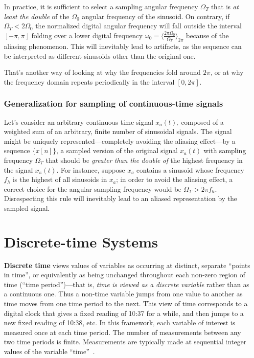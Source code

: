 \documentclass[\documentfontsize, twocolumn]{\classname}
\begin{document}
In practice, it is sufficient to select a sampling angular frequency $\Omega_T$ that is \emph{at least the double} of the $\Omega_0$ angular frequency of the sinusoid. On contrary, if $\Omega_T < 2\Omega_0$ the normalized digital angular frequency will fall outside the interval $[-\pi, \pi]$ folding over a lower digital frequency $\omega_0 = \langle \frac{2 \pi \Omega_0 }{\Omega_T}\rangle_{2\pi}$ because of the aliasing phenomenon. This will inevitably lead to artifacts, as the sequence can be interpreted as different sinusoids other than the original one.

That's another way of looking at why the frequencies fold around $2\pi$, or at why the frequency domain repeats periodically in the interval $[0, 2\pi]$.

\subsection{Generalization for sampling of continuous-time signals}

Let's consider an arbitrary continuous-time signal $x_a(t)$, composed of a weighted sum of an arbitrary, finite number of sinusoidal signals. The signal might be uniquely represented---completely avoiding the aliasing effect---by a sequence $\{x[n]\}$, a sampled version of the original signal $x_a(t)$ with sampling frequency $\Omega_T$ that should be \emph{greater than the double of} the highest frequency in the signal $x_a(t)$. For instance, suppose $x_a$ contains a sinusoid whose frequency $f_h$ is the highest of all sinusoids in $x_a$; in order to avoid the aliasing effect, a correct choice for the angular sampling frequency would be $\Omega_T > 2\pi f_h$. Disrespecting this rule will inevitably lead to an aliased representation by the sampled signal.


\chapter{Discrete-time Systems}

\textbf{Discrete time} views values of variables as occurring at distinct, separate ``points in time'', or equivalently as being unchanged throughout each non-zero region of time (``time pe\-ri\-od'')---that is, \emph{time is viewed as a discrete variable} rather than as a continuous one. Thus a non-time variable jumps from one value to another as time moves from one time period to the next. This view of time corresponds to a digital clock that gives a fixed reading of 10:37 for a while, and then jumps to a new fixed reading of 10:38, etc. In this framework, each variable of interest is measured once at each time period. The number of measurements between any two time periods is finite. Measurements are typically made at sequential integer values of the variable ``time''~\cite{bib:discreteTimeSystems}.
\end{document}
